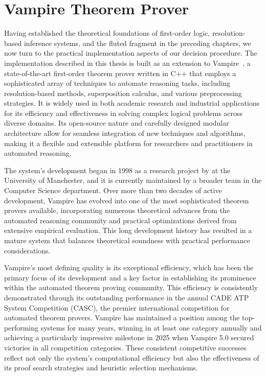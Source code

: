 \chapter{Vampire Theorem Prover}\label{chap:vampire-theorem-prover}
Having established the theoretical foundations of first-order logic, resolution-based inference systems, and the fluted fragment in the preceding chapters, we now turn to the practical implementation aspects of our decision procedure.
The implementation described in this thesis is built as an extension to Vampire~\cite{kovacs2013vampire,AVATAR,riazanov2002design}, a state-of-the-art first-order theorem prover written in C++ that employs a sophisticated array of techniques to automate reasoning tasks, including resolution-based methods, superposition calculus, and various preprocessing strategies.
It is widely used in both academic research and industrial applications for its efficiency and effectiveness in solving complex logical problems across diverse domains.
Its open-source nature and carefully designed modular architecture allow for seamless integration of new techniques and algorithms, making it a flexible and extensible platform for researchers and practitioners in automated reasoning.

The system's development began in 1998 as a research project by \citeauthor{riazanov2002design} at the University of Manchester, and it is currently maintained by a broader team in the Computer Science department.
Over more than two decades of active development, Vampire has evolved into one of the most sophisticated theorem provers available, incorporating numerous theoretical advances from the automated reasoning community and practical optimizations derived from extensive empirical evaluation.
This long development history has resulted in a mature system that balances theoretical soundness with practical performance considerations.

Vampire's most defining quality is its exceptional efficiency, which has been the primary focus of its development and a key factor in establishing its prominence within the automated theorem proving community.
This efficiency is consistently demonstrated through its outstanding performance in the annual CADE ATP System Competition (CASC), the premier international competition for automated theorem provers.
Vampire has maintained a position among the top-performing systems for many years, winning in at least one category annually and achieving a particularly impressive milestone in 2025 when Vampire 5.0 secured victories in all competition categories.
These consistent competitive successes reflect not only the system's computational efficiency but also the effectiveness of its proof search strategies and heuristic selection mechanisms.

